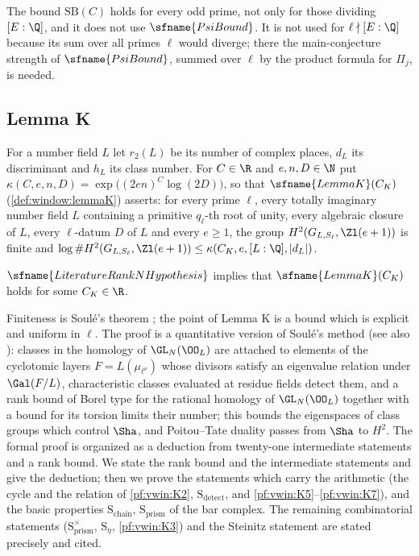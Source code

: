 \begin{remark}\label{pf:vwin:rem-SB}
The bound $\mathrm{SB}(C)$ holds for every odd prime, not only for those dividing $[E:\Q]$, and it does not use $\sfname{PsiBound}$. It is not used for
$\ell\nmid[E:\Q]$ because its sum over all primes $\ell$ would diverge; there the main-conjecture strength of $\sfname{PsiBound}$, summed over $\ell$ by
the product formula for $\Pi_j$, is needed.
\end{remark}


\subsection{Lemma K}\label{sec:pf:vwin:lemmaK}

For a number field $L$ let $r_2(L)$ be its number of complex places, $d_L$ its discriminant and $h_L$ its class number. For $C\in\R$ and
$e,n,D\in\N$ put $\kappa(C,e,n,D)=\exp\bigl((2en)^C\log(2D)\bigr)$, so that $\sfname{LemmaK}(C_K)$ (\cref{def:window:lemmaK}) asserts: for every
prime $\ell$, every totally imaginary number field $L$ containing a primitive $q_\ell$-th root of unity, every algebraic closure of $L$, every
$\ell$-datum $D$ of $L$ and every $e\ge1$, the group $H^2(G_{L,S_\ell},\Zl(e+1))$ is finite and
$\log\#H^2(G_{L,S_\ell},\Zl(e+1))\le\kappa(C_K,e,[L:\Q],|d_L|)$.

\begin{theorem}\label{pf:vwin:lemmaK}
$\sfname{LiteratureRankNHypothesis}$ implies that $\sfname{LemmaK}(C_K)$ holds for some $C_K\in\R$.
\end{theorem}

Finiteness is Soul\'e's theorem \cite{Soule1979}; the point of Lemma K is a bound which is explicit and uniform in $\ell$. The proof is a
quantitative version of Soul\'e's method (see also \cite{DwyerFriedlander1985}): classes in the homology of $\GL_N(\OO_L)$ are attached to
elements of the cyclotomic layers $F=L(\mu_{\ell^\nu})$ whose divisors satisfy an eigenvalue relation under $\Gal(F/L)$, characteristic
classes evaluated at residue fields detect them, and a rank bound of Borel type for the rational homology of $\GL_N(\OO_L)$ together with a
bound for its torsion limits their number; this bounds the eigenspaces of class groups which control $\Sha$, and Poitou--Tate duality passes
from $\Sha$ to $H^2$. The formal proof is organized as a deduction from twenty-one intermediate statements and a rank bound. We state the rank
bound and the intermediate statements and give the deduction; then we prove the statements which carry the arithmetic (the cycle and
the relation of \ref{pf:vwin:K2}, $\mathrm S_{\mathrm{detect}}$, and \ref{pf:vwin:K5}--\ref{pf:vwin:K7}), and the basic properties
$\mathrm S_{\mathrm{chain}}$, $\mathrm S_{\mathrm{prism}}$ of the bar complex. The remaining combinatorial statements
($\mathrm S^\times_{\mathrm{prism}}$, $\mathrm S_\eta$, \ref{pf:vwin:K3}) and the Steinitz statement are stated precisely and cited.

